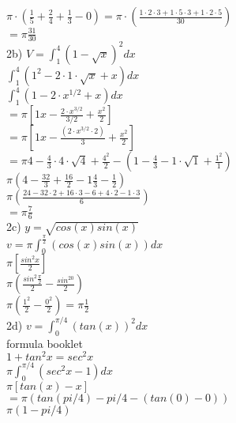 \documentclass{article}
\begin{document}
  $\pi\cdot(\frac{1}{5}+\frac{2}{4}+\frac{1}{3}-0)=\pi\cdot (\frac{1\cdot2\cdot3+1\cdot5\cdot3+1\cdot2\cdot5}{30})$\\
  $=\pi\frac{31}{30}$\\
  2b) $V=\int_{1}^{4}(1-\sqrt{x})^2dx$\\
  $\int_{1}^{4}(1^2-2\cdot 1\cdot \sqrt{x}+x)dx$\\
  $\int_{1}^{4}(1-2\cdot x^{1/2}+x)dx$\\
  $=\pi[ 1x -\frac{2\cdot x^{3/2}}{3/2}+\frac{x^2}{2}]$\\
  $=\pi[1x-\frac{(2\cdot x^{3/2}\cdot 2)}{3}+\frac{x^2}{2}]$\\
  $=\pi4- \frac{4}{3}\cdot 4\cdot\sqrt{4}+\frac{4^2}{2}-(1-\frac{4}{3}-1\cdot\sqrt{1}+\frac{1^2}{1})$\\
  $\pi(4-\frac{32}{3}+\frac{16}{2}-1\frac{4}{3}-\frac{1}{2})$\\
  $\pi(\frac{24-32\cdot2+16\cdot3-6+4\cdot2-1\cdot3}{6})$\\
  $=\pi\frac{7}{6}$\\
  2c) $y=\sqrt{cos(x)sin(x)}$\\
  $v=\pi\int_{0}^{\frac{\pi}{2}}(cos(x)sin(x))dx$\\
  $\pi[\frac{sin^2x}{2}]$\\
  $\pi(\frac{sin^2\frac{\pi}{2}}{2}- \frac{sin^20}{2})$\\
  $\pi(\frac{1^2}{2}-\frac{0^2}{2})=\pi\frac{1}{2}$\\
  2d) $v=\int_{0}^{\pi/4}(tan(x))^2dx$\\
  formula booklet\\
  $1+tan^2x=sec^2x$\\
  $\pi\int_{0}^{\pi/4}(sec^2x-1)dx$\\
  $\pi [tan (x) - x]$\\
  $=\pi(tan(pi/4)-pi/4 - (tan(0)-0))$\\
  $\pi(1-pi/4)$\\


  
\end{document}
